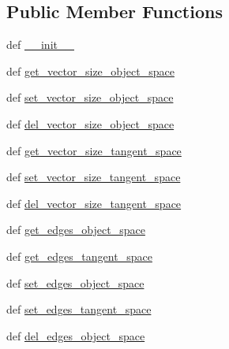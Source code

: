 \subsection*{Public Member Functions}
\begin{DoxyCompactItemize}
\item 
def \hyperlink{classdestruction_1_1_bounding_box_1_1_bounding_box2_d_a11145711c75725feaf1e938a04eab16c}{\-\_\-\-\_\-init\-\_\-\-\_\-}
\item 
def \hyperlink{classdestruction_1_1_bounding_box_1_1_bounding_box2_d_a0c87bf68070ff6ee2974ae48c264d59b}{get\-\_\-vector\-\_\-size\-\_\-object\-\_\-space}
\item 
def \hyperlink{classdestruction_1_1_bounding_box_1_1_bounding_box2_d_a021d008fbd18594c99b3ebb7db1adcdc}{set\-\_\-vector\-\_\-size\-\_\-object\-\_\-space}
\item 
def \hyperlink{classdestruction_1_1_bounding_box_1_1_bounding_box2_d_a933375a5b638c45fa90afdafcf3fe76b}{del\-\_\-vector\-\_\-size\-\_\-object\-\_\-space}
\item 
def \hyperlink{classdestruction_1_1_bounding_box_1_1_bounding_box2_d_ac2d394b16035f5d4d15cc5e924674fcd}{get\-\_\-vector\-\_\-size\-\_\-tangent\-\_\-space}
\item 
def \hyperlink{classdestruction_1_1_bounding_box_1_1_bounding_box2_d_adca17d1ee74c2950d2106b13490a11e0}{set\-\_\-vector\-\_\-size\-\_\-tangent\-\_\-space}
\item 
def \hyperlink{classdestruction_1_1_bounding_box_1_1_bounding_box2_d_a7bdf94f380c462cd5a080fab65413d17}{del\-\_\-vector\-\_\-size\-\_\-tangent\-\_\-space}
\item 
def \hyperlink{classdestruction_1_1_bounding_box_1_1_bounding_box2_d_ab96328ba2ea0c6dd638a725186f4b413}{get\-\_\-edges\-\_\-object\-\_\-space}
\item 
def \hyperlink{classdestruction_1_1_bounding_box_1_1_bounding_box2_d_a3f1db2c8652ad767b2615556233e29ec}{get\-\_\-edges\-\_\-tangent\-\_\-space}
\item 
def \hyperlink{classdestruction_1_1_bounding_box_1_1_bounding_box2_d_a74ee3e291c5ab33fa6de38d34d1dfb0f}{set\-\_\-edges\-\_\-object\-\_\-space}
\item 
def \hyperlink{classdestruction_1_1_bounding_box_1_1_bounding_box2_d_a66a0354305b2afc0fcd889011138691a}{set\-\_\-edges\-\_\-tangent\-\_\-space}
\item 
def \hyperlink{classdestruction_1_1_bounding_box_1_1_bounding_box2_d_ab9c417c5505fc4d87d6ffeebf5ec7cf1}{del\-\_\-edges\-\_\-object\-\_\-space}

\end{DoxyCompactItemize}

